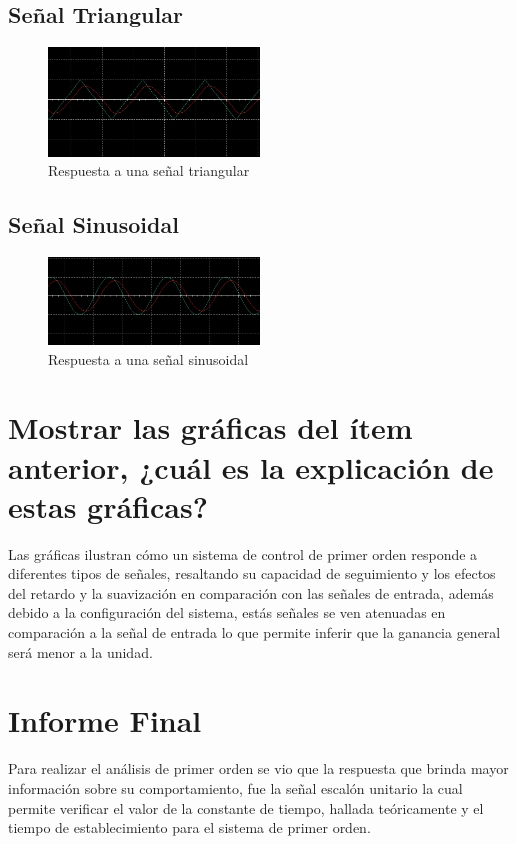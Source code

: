 \documentclass[conference]{IEEEtran}
\begin{document}
	\subsection{Señal Triangular}
	
	\begin{figure}[h]
		\centering
		\includegraphics[width=0.5\textwidth]{../INFORME PREVIO/media/triangular}
		\caption{Respuesta a una señal triangular}
		\label{fig:triangular}
	\end{figure}
	
	\subsection{Señal Sinusoidal}
	
	\begin{figure}
		\centering
		\includegraphics[width=0.5\textwidth]{../INFORME PREVIO/media/sinusoidal}
		\caption{Respuesta a una señal sinusoidal}
		\label{fig:sinusoidal}
	\end{figure}
	
	\section{Mostrar las gráficas del ítem anterior, ¿cuál es la explicación de estas gráficas?}
	Las gráficas ilustran cómo un sistema de control de primer orden responde a diferentes tipos de señales, resaltando su capacidad de seguimiento y los efectos del retardo y la suavización en comparación con las señales de entrada, además debido a la configuración del sistema, estás señales se ven atenuadas en comparación a la señal de entrada lo que permite inferir que la ganancia general será menor a la unidad.
	
	\section{Informe Final}
	Para realizar el análisis de primer orden se vio que la respuesta que brinda mayor información sobre su comportamiento, fue la señal escalón unitario la cual permite verificar el valor de la constante de tiempo, hallada teóricamente y el tiempo de establecimiento para el sistema de primer orden.
	
\end{document}
